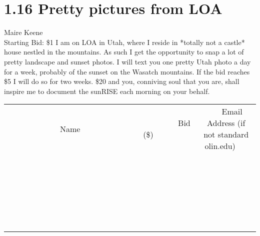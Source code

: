 \documentclass[11pt]{article}
\begin{document}
\section*{1.16 Pretty pictures from LOA}
Maire Keene
\\
Starting Bid: \$1
\newline
I am on LOA in Utah, where I reside in *totally not a castle* house nestled in the mountains. As such I get the opportunity to snap a lot of pretty landscape and sunset photos. I will text you one pretty Utah photo a day for a week, probably of the sunset on the Wasatch mountains. If the bid reaches \$5 I will do so for two weeks. \$20 and you, conniving soul that you are, shall inspire me to document the sunRISE each morning on your behalf.
\\[6ex]
\begin{tabular}{c c c}
~~~~~~~~~~~~~Name~~~~~~~~~~~~~ & ~~~~~~~~~Bid (\$)~~~~~~~~~  & ~~~Email Address (if not standard olin.edu)~~~\\
 & & \\
\hline
 & & \\
\hline
 & & \\
\hline
 & & \\
\hline
 & & \\
\hline
 & & \\
\hline
 & & \\
\hline
 & & \\
\hline
 & & \\
\hline
 & & \\
\hline
 & & \\
\hline
 & & \\
\hline
 & & \\
\hline
 & & \\
\hline
 & & \\
\hline
 & & \\
\hline
 & & \\
\hline
 & & \\
\hline
 & & \\
\hline
 & & \\
\hline
 & & \\
\hline
 & & \\
\hline
 & & \\
\hline
 & & \\
\hline
 & & \\
\hline
 & & \\
\hline
\end{tabular}
\newpage
\end{document}
